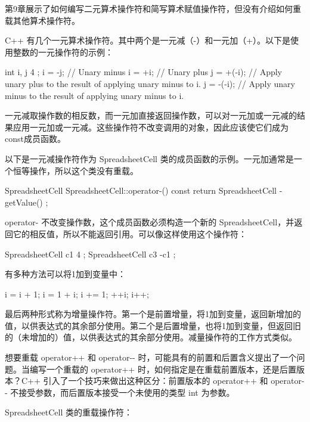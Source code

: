 
第9章展示了如何编写二元算术操作符和简写算术赋值操作符，但没有介绍如何重载其他算术操作符。


C++ 有几个一元算术操作符。其中两个是一元减（-）和一元加（+）。以下是使用整数的一元操作符的示例：

\begin{cpp}
int i, j { 4 };
i = -j; // Unary minus
i = +i; // Unary plus
j = +(-i); // Apply unary plus to the result of applying unary minus to i.
j = -(-i); // Apply unary minus to the result of applying unary minus to i.
\end{cpp}

一元减取操作数的相反数，而一元加直接返回操作数，可以对一元加或一元减的结果应用一元加或一元减。这些操作符不改变调用的对象，因此应该使它们成为const成员函数。

以下是一元减操作符作为 SpreadsheetCell 类的成员函数的示例。一元加通常是一个恒等操作，所以这个类没有重载。

\begin{cpp}
SpreadsheetCell SpreadsheetCell::operator-() const
{
    return SpreadsheetCell { -getValue() };
}
\end{cpp}

operator- 不改变操作数，这个成员函数必须构造一个新的 SpreadsheetCell，并返回它的相反值，所以不能返回引用。可以像这样使用这个操作符：

\begin{cpp}
SpreadsheetCell c1 { 4 };
SpreadsheetCell c3 { -c1 };
\end{cpp}


有多种方法可以将1加到变量中：

\begin{cpp}
i = i + 1;
i = 1 + i;
i += 1;
++i;
i++;
\end{cpp}

最后两种形式称为增量操作符。第一个是前置增量，将1加到变量，返回新增加的值，以供表达式的其余部分使用。第二个是后置增量，也将1加到变量，但返回旧的（未增加的）值，以供表达式的其余部分使用。减量操作符的工作方式类似。

想要重载 operator++ 和 operator-{}- 时，可能具有的前置和后置含义提出了一个问题。当编写一个重载的 operator++ 时，如何指定是在重载前置版本，还是后置版本？C++ 引入了一个技巧来做出这种区分：前置版本的 operator++ 和 operator-{}- 不接受参数，而后置版本接受一个未使用的类型 int 为参数。

SpreadsheetCell 类的重载操作符：

